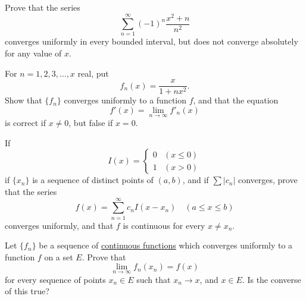   \begin{exercise}[Rudin 7.6]
    Prove that the series
    \begin{equation}
      \sum_{n=1}^{\infty} (-1)^n \frac{x^2 + n}{n^2}
    \end{equation}
    converges uniformly in every bounded interval, but does not converge absolutely for any value of $x$.
  \end{exercise}
  \begin{solution}

  \end{solution}

  \begin{exercise}[Rudin 7.7]
    For $n = 1, 2, 3, \dots, x$ real, put
    \begin{equation}
      f_n(x) = \frac{x}{1 + nx^2}.
    \end{equation}
    Show that $\{f_n\}$ converges uniformly to a function $f$, and that the equation
    \begin{equation}
      f'(x) = \lim_{n \to \infty} f'_n(x)
    \end{equation}
    is correct if $x \ne 0$, but false if $x = 0$.
  \end{exercise}
  \begin{solution}

  \end{solution}

  \begin{exercise}[Rudin 7.8]
    If
    \begin{equation}
      I(x) = 
      \begin{cases}
        0 & (x \le 0) \\
        1 & (x > 0)
      \end{cases}
    \end{equation}
    if $\{x_n\}$ is a sequence of distinct points of $(a, b)$, and if $\sum |c_n|$ converges, prove that the series
    \begin{equation}
      f(x) = \sum_{n=1}^{\infty} c_n I(x - x_n) \quad (a \le x \le b)
    \end{equation}
    converges uniformly, and that $f$ is continuous for every $x \ne x_n$.
  \end{exercise}
  \begin{solution}

  \end{solution}

  \begin{exercise}[Rudin 7.9]
    Let $\{f_n\}$ be a sequence of \hyperref[pst-def:continuous_func]{continuous functions} which converges uniformly to a function $f$ on a set $E$. Prove that
    \begin{equation}
      \lim_{n \to \infty} f_n(x_n) = f(x)
    \end{equation}
    for every sequence of points $x_n \in E$ such that $x_n \to x$, and $x \in E$. Is the converse of this true?
  \end{exercise}
  \begin{solution}

  \end{solution}

